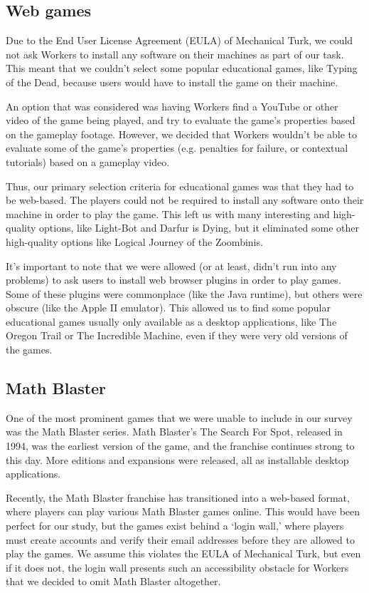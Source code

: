 \documentclass[12pt]{report}
\begin{document}
		\subsection{Web games}
			Due to the End User License Agreement (EULA) of Mechanical Turk, we could not ask Workers to install any software on their machines as part of our task. This meant that we couldn't select some popular educational games, like Typing of the Dead, because users would have to install the game on their machine.

			An option that was considered was having Workers find a YouTube or other video of the game being played, and try to evaluate the game's properties based on the gameplay footage. However, we decided that Workers wouldn't be able to evaluate some of the game's properties (e.g. penalties for failure, or contextual tutorials) based on a gameplay video. 

			Thus, our primary selection criteria for educational games was that they had to be web-based. The players could not be required to install any software onto their machine in order to play the game. This left us with many interesting and high-quality options, like Light-Bot and Darfur is Dying, but it eliminated some other high-quality options like Logical Journey of the Zoombinis.

			It's important to note that we were allowed (or at least, didn't run into any problems) to ask users to install web browser plugins in order to play games. Some of these plugins were commonplace (like the Java runtime), but others were obscure (like the Apple II emulator). This allowed us to find some popular educational games usually only available as a desktop applications, like The Oregon Trail or The Incredible Machine, even if they were very old versions of the games.

		\subsection{Math Blaster}
			One of the most prominent games that we were unable to include in our survey was the Math Blaster series. Math Blaster's The Search For Spot, released in 1994, was the earliest version of the game, and the franchise continues strong to this day. More editions and expansions were released, all as installable desktop applications.

			Recently, the Math Blaster franchise has transitioned into a web-based format, where players can play various Math Blaster games online. This would have been perfect for our study, but the games exist behind a `login wall,' where players must create accounts and verify their email addresses before they are allowed to play the games. We assume this violates the EULA of Mechanical Turk, but even if it does not, the login wall presents such an accessibility obstacle for Workers that we decided to omit Math Blaster altogether. 
\end{document}
